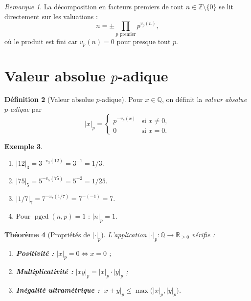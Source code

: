 \documentclass[12pt,a4paper,openany]{book}
\theoremstyle{definition}
\newtheorem{definition}{Définition}[chapter]
\newtheorem{exemple}[definition]{Exemple}
\theoremstyle{plain}
\newtheorem{theoreme}[definition]{Théorème}
\theoremstyle{remark}
\newtheorem{remarque}[definition]{Remarque}
\newcommand{\Z}{\mathbb{Z}}
\newcommand{\Q}{\mathbb{Q}}
\newcommand{\R}{\mathbb{R}}
\newcommand{\abs}[1]{\left|#1\right|}
\DeclareMathOperator{\pgcd}{pgcd}
\begin{document}
\begin{remarque}
\label{rem:decomposition-fondamentale}
La décomposition en facteurs premiers de tout $n \in \Z \setminus \{0\}$ se lit
directement sur les valuations :
\[
  n = \pm \prod_{p \text{ premier}} p^{v_p(n)},
\]
où le produit est fini car $v_p(n) = 0$ pour presque tout $p$.
\end{remarque}


\section{Valeur absolue \texorpdfstring{$p$}{p}-adique}
\label{sec:valeur-absolue-p-adique}

\begin{definition}[Valeur absolue $p$-adique]
\label{def:valeur-absolue-p-adique}
Pour $x \in \Q$, on définit la \emph{valeur absolue $p$-adique} par
\[
  \abs{x}_p =
  \begin{cases}
    p^{-v_p(x)} & \text{si } x \neq 0, \\
    0 & \text{si } x = 0.
  \end{cases}
\]
\end{definition}

\begin{exemple}
\label{ex:valeur-absolue-p-adique}
\begin{enumerate}[label=(\roman*)]
  \item $\abs{12}_3 = 3^{-v_3(12)} = 3^{-1} = 1/3$.
  \item $\abs{75}_5 = 5^{-v_5(75)} = 5^{-2} = 1/25$.
  \item $\abs{1/7}_7 = 7^{-v_7(1/7)} = 7^{-(-1)} = 7$.
  \item Pour $\pgcd(n, p) = 1$ : $\abs{n}_p = 1$.
\end{enumerate}
\end{exemple}

\begin{theoreme}[Propriétés de $\abs{\cdot}_p$]
\label{thm:proprietes-valeur-absolue}
L'application $\abs{\cdot}_p : \Q \to \R_{\geq 0}$ vérifie :
\begin{enumerate}[label=(\roman*)]
  \item \textbf{Positivité :} $\abs{x}_p = 0 \iff x = 0$ ;
  \item \textbf{Multiplicativité :} $\abs{xy}_p = \abs{x}_p \cdot \abs{y}_p$ ;
  \item \textbf{Inégalité ultramétrique :}
    $\abs{x + y}_p \leq \max\bigl(\abs{x}_p, \abs{y}_p\bigr)$.
\end{enumerate}
\end{theoreme}
\end{document}
